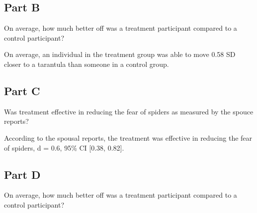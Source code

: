 \documentclass[]{article}
\newenvironment{Shaded}{\begin{snugshade}}{\end{snugshade}}
\newcommand{\KeywordTok}[1]{\textcolor[rgb]{0.13,0.29,0.53}{\textbf{#1}}}
\newcommand{\DataTypeTok}[1]{\textcolor[rgb]{0.13,0.29,0.53}{#1}}
\newcommand{\DecValTok}[1]{\textcolor[rgb]{0.00,0.00,0.81}{#1}}
\newcommand{\StringTok}[1]{\textcolor[rgb]{0.31,0.60,0.02}{#1}}
\newcommand{\OperatorTok}[1]{\textcolor[rgb]{0.81,0.36,0.00}{\textbf{#1}}}
\newcommand{\NormalTok}[1]{#1}
\begin{document}
\subsection{Part B}\label{part-b-2}

On average, how much better off was a treatment participant compared to
a control participant?

On average, an individual in the treatment group was able to move 0.58
SD closer to a tarantula than someone in a control group.

\subsection{Part C}\label{part-c-1}

Was treatment effective in reducing the fear of spiders as measured by
the spouce reports?

According to the spousal reports, the treatment was effective in
reducing the fear of spiders, d = 0.6, 95\% CI {[}0.38, 0.82{]}.

\subsection{Part D}\label{part-d-1}

On average, how much better off was a treatment participant compared to
a control participant?

\begin{Shaded}
\end{Shaded}
\end{document}
